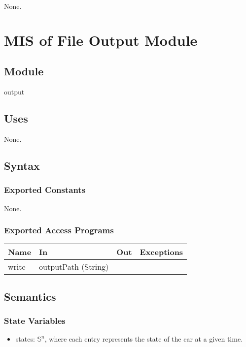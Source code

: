 \documentclass[12pt, titlepage]{article}
\begin{document}
None.

\newpage

\section{MIS of File Output Module} \label{Module_file_output}

\subsection{Module}

output

\subsection{Uses}
None.

\subsection{Syntax}

\subsubsection{Exported Constants}
None.

\subsubsection{Exported Access Programs}

\begin{center}
\begin{tabular}{p{2cm} p{4cm} p{4cm} p{2cm}}
\hline
\textbf{Name} & \textbf{In} & \textbf{Out} & \textbf{Exceptions} \\
\hline
write & outputPath (String) & - & - \\
\hline
\end{tabular}
\end{center}

\subsection{Semantics}

\subsubsection{State Variables}

\begin{itemize}
  \item states: $\mathbb{S}^n$, where each entry represents the state of the car at a given time.
\end{itemize}
\end{document}
